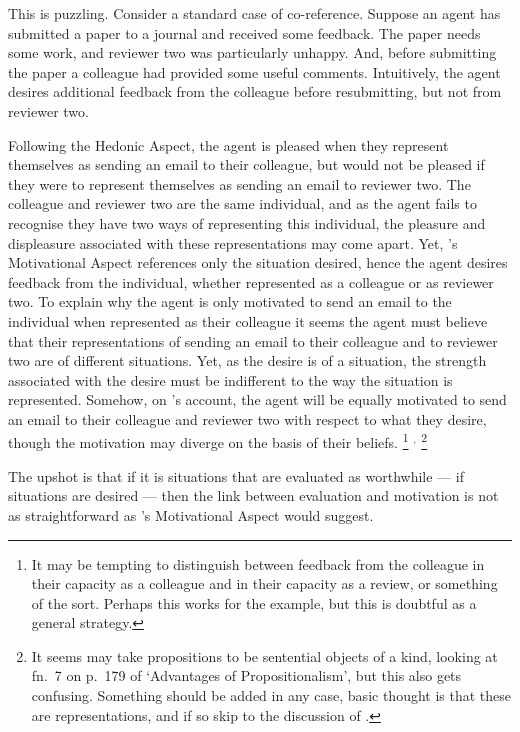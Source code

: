 \documentclass[10pt]{article}
\begin{document}
This is puzzling.
Consider a standard case of co-reference.
Suppose an agent has submitted a paper to a journal and received some feedback.
The paper needs some work, and reviewer two was particularly unhappy.
And, before submitting the paper a colleague had provided some useful comments.
Intuitively, the agent desires additional feedback from the colleague before resubmitting, but not from reviewer two.

Following the Hedonic Aspect, the agent is pleased when they represent themselves as sending an email to their colleague, but would not be pleased if they were to represent themselves as sending an email to reviewer two.
The colleague and reviewer two are the same individual, and as the agent fails to recognise they have two ways of representing this individual, the pleasure and displeasure associated with these representations may come apart.
Yet, \citeauthor{Sinhababu:2017aa}'s Motivational Aspect references only the situation desired, hence the agent desires feedback from the individual, whether represented as a colleague or as reviewer two.
To explain why the agent is only motivated to send an email to the individual when represented as their colleague it seems the agent must believe that their representations of sending an email to their colleague and to reviewer two are of different situations.
Yet, as the desire is of a situation, the strength associated with the desire must be indifferent to the way the situation is represented.
Somehow, on \citeauthor{Sinhababu:2017aa}'s account, the agent will be equally motivated to send an email to their colleague and reviewer two with respect to what they desire, though the motivation may diverge on the basis of their beliefs.\nolinebreak
\footnote{It may be tempting to distinguish between feedback from the colleague in their capacity as a colleague and in their capacity as a review, or something of the sort.
  Perhaps this works for the example, but this is doubtful as a general strategy.}\nolinebreak
\(^{\text{,}}\)\nolinebreak
\footnote{It seems \citeauthor{Sinhababu:2017aa} may take propositions to be sentential objects of a kind, looking at fn.\ 7 on p.\ 179 of `Advantages of Propositionalism', but this also gets confusing.
Something should be added in any case, basic thought is that these are representations, and if so skip to the discussion of \citeauthor{Railton:2012aa}.}

The upshot is that if it is situations that are evaluated as worthwhile --- if situations are desired --- then the link between evaluation and motivation is not as straightforward as \citeauthor{Sinhababu:2017aa}'s Motivational Aspect would suggest.
\end{document}
